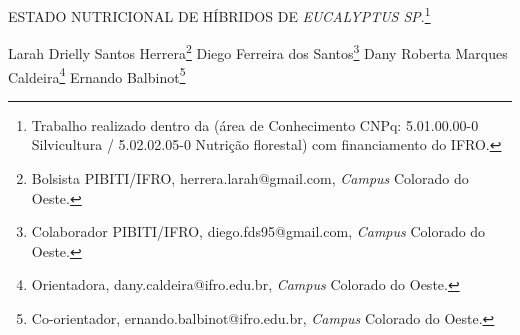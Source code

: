 \documentclass[article,12pt,onesidea,4paper,english,brazil]{abntex2}
\begin{document}
	
	
	\frenchspacing 
	
	\begin{center}
		\LARGE ESTADO NUTRICIONAL DE HÍBRIDOS DE \textit{EUCALYPTUS SP}.\footnote{Trabalho realizado dentro da (área de Conhecimento CNPq: 5.01.00.00-0 Silvicultura / 5.02.02.05-0 Nutrição florestal) com financiamento do IFRO.}
		
		\normalsize
		Larah Drielly Santos Herrera\footnote{Bolsista PIBITI/IFRO, herrera.larah@gmail.com, \textit{Campus} Colorado do Oeste.} 
		Diego Ferreira dos Santos\footnote{Colaborador PIBITI/IFRO, diego.fds95@gmail.com, \textit{Campus} Colorado do Oeste.} 
		Dany Roberta Marques Caldeira\footnote{Orientadora, dany.caldeira@ifro.edu.br, \textit{Campus} Colorado do Oeste.} 
		Ernando Balbinot\footnote{Co-orientador, ernando.balbinot@ifro.edu.br, \textit{Campus} Colorado do Oeste.} 
	\end{center}
	
\end{document}
